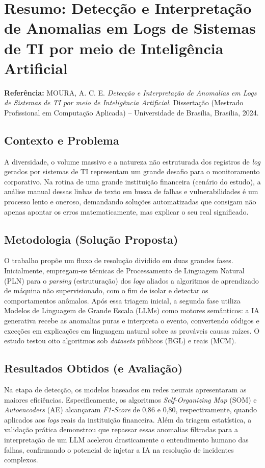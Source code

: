 \documentclass[12pt, a4paper]{article}
\begin{document}
\section*{Resumo: Detecção e Interpretação de Anomalias em Logs de Sistemas de TI por meio de Inteligência Artificial}
\label{sec:resumo_moura2024deteccao}

\noindent\textbf{Referência:} MOURA, A. C. E. \textit{Detecção e Interpretação de Anomalias em Logs de Sistemas de TI por meio de Inteligência Artificial}. Dissertação (Mestrado Profissional em Computação Aplicada) -- Universidade de Brasília, Brasília, 2024.

\subsection*{Contexto e Problema}
A diversidade, o volume massivo e a natureza não estruturada dos registros de \textit{log} gerados por sistemas de TI representam um grande desafio para o monitoramento corporativo. Na rotina de uma grande instituição financeira (cenário do estudo), a análise manual dessas linhas de texto em busca de falhas e vulnerabilidades é um processo lento e oneroso, demandando soluções automatizadas que consigam não apenas apontar os erros matematicamente, mas explicar o seu real significado.

\subsection*{Metodologia (Solução Proposta)}
O trabalho propõe um fluxo de resolução dividido em duas grandes fases. Inicialmente, empregam-se técnicas de Processamento de Linguagem Natural (PLN) para o \textit{parsing} (estruturação) dos \textit{logs} aliados a algoritmos de aprendizado de máquina não supervisionado, com o fim de isolar e detectar os comportamentos anômalos. Após essa triagem inicial, a segunda fase utiliza Modelos de Linguagem de Grande Escala (LLMs) como motores semânticos: a IA generativa recebe as anomalias puras e interpreta o evento, convertendo códigos e exceções em explicações em linguagem natural sobre as prováveis causas raízes. O estudo testou oito algoritmos sob \textit{datasets} públicos (BGL) e reais (MCM).

\subsection*{Resultados Obtidos (e Avaliação)}
Na etapa de detecção, os modelos baseados em redes neurais apresentaram as maiores eficiências. Especificamente, os algoritmos \textit{Self-Organizing Map} (SOM) e \textit{Autoencoders} (AE) alcançaram \textit{F1-Score} de 0,86 e 0,80, respectivamente, quando aplicados aos \textit{logs} reais da instituição financeira. Além da triagem estatística, a validação prática demonstrou que repassar essas anomalias filtradas para a interpretação de um LLM acelerou drasticamente o entendimento humano das falhas, confirmando o potencial de injetar a IA na resolução de incidentes complexos.
\end{document}
